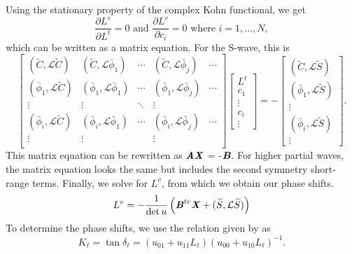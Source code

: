 \documentclass[preprint,showpacs,preprintnumbers,amsmath,amssymb]{revtex4}
\newcommand{\beq}{\begin{equation}}
\newcommand{\eeq}{\end{equation}}
\begin{document}
Using the stationary property of the complex Kohn functional, we get
\beq
\frac{\partial L^v}{\partial L^t} = 0  \text{ and } \frac{\partial L^v}{\partial c_i} = 0 \text{ where $i = 1,\ldots,N$},
\label{eq:ComplexKohnStationary}
\eeq
which can be written as a matrix equation. For the S-wave, this is
\begin{equation}
\label{eq:ComplexKohnMatrix}
\begin{bmatrix} 
 (\widetilde{C},\mathcal{L}\widetilde{C}) & (\widetilde{C},\mathcal{L}\bar{\phi}_1) & \cdots & (\widetilde{C},\mathcal{L}\bar{\phi}_j) & \cdots\\
 (\bar{\phi}_1,\mathcal{L}\widetilde{C}) & (\bar{\phi}_1,\mathcal{L}\bar{\phi}_1) & \cdots & (\bar{\phi}_1,\mathcal{L}\bar{\phi}_j) & \cdots\\
 \vdots & \vdots & \ddots & \vdots \\
 (\bar{\phi}_i,\mathcal{L}\widetilde{C}) & (\bar{\phi}_i,\mathcal{L}\bar{\phi}_1) & \cdots & (\bar{\phi}_i,\mathcal{L}\bar{\phi}_j) & \cdots\\
 \vdots & \vdots & & \vdots & \\
\end{bmatrix}
\begin{bmatrix}
L^t\\
c_1\\
\vdots\\
c_i\\
\vdots
\end{bmatrix}
= -
\begin{bmatrix}
(\widetilde{C},\mathcal{L}\widetilde{S}) \\
(\bar{\phi}_1,\mathcal{L}\widetilde{S}) \\
\vdots \\
(\bar{\phi}_i,\mathcal{L}\widetilde{S}) \\
\vdots
\end{bmatrix}.
\end{equation}
This matrix equation can be rewritten as $\textbf{\emph{AX}}$ = -$\textbf{\emph{B}}$. For higher partial waves, the matrix equation looks the same but includes the second symmetry short-range terms. Finally, we solve for $L^v$, from which we obtain our phase shifts.
\begin{equation}
L^v = -\frac{1}{\det u} \left( \textbf{\emph{B}}^{tr} \textbf{\emph{X}} + (\widetilde{S},\mathcal{L} \widetilde{S}) \right)
\end{equation}
To determine the phase shifts, we use the relation given by \cite{Lucchese1989} as
\begin{equation}
K_\ell = \tan \delta_\ell = (u_{01} + u_{11} L_\ell)(u_{00} + u_{10} L_\ell)^{-1}.
\end{equation}
\end{document}
